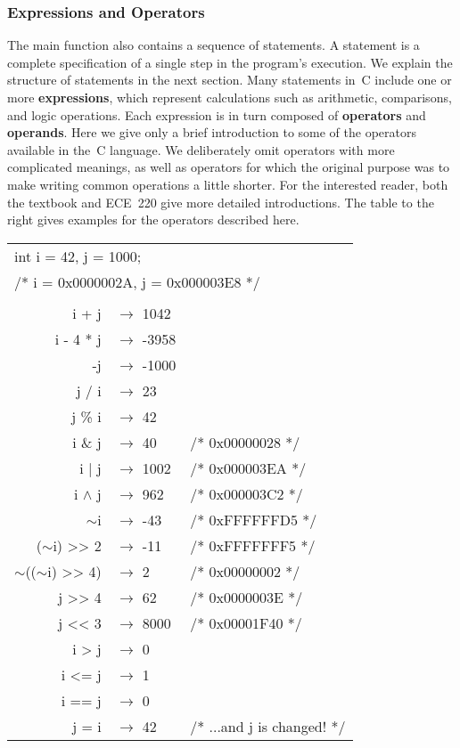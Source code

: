 \subsubsection{Expressions and Operators}

\begin{minipage}{2.6in}
The {\tfix main} function also contains a sequence of statements.
%
A statement is a complete specification of a single step
in the program's execution.
%
We explain the structure of
statements in the next section.  
%
Many statements in~C include one or more {\bf expressions},
which represent calculations such as arithmetic, comparisons,
and logic operations.
%
Each expression is in turn composed of {\bf operators} and {\bf operands}.
%
Here we give only a brief introduction to some of the operators available
in the~C language.  We deliberately omit operators with more
complicated meanings, as well as operators for which the original
purpose was to make writing common operations a little shorter.
%
For the interested reader, both the textbook and ECE~220 give more 
detailed introductions.
%
The table to the right gives examples for the operators described 
here.  \vspace{2pt}

\end{minipage}\hspace{0.25in}%
\begin{minipage}{3.65in}
{\fix
\begin{tabular}{rll}
\multicolumn{3}{l}{int i = 42, j = 1000;}\\
\multicolumn{3}{l}{/* i = 0x0000002A, j = 0x000003E8 */}\\
\\
i + j & $\rightarrow$ 1042\\
i - 4 * j & $\rightarrow$ -3958\\
-j & $\rightarrow$ -1000\\
j / i & $\rightarrow$ 23\\
j \% i &  $\rightarrow$ 42\\
i \& j &  $\rightarrow$ 40& /* 0x00000028 */\\
i | j &  $\rightarrow$ 1002& /* 0x000003EA */\\
i $\wedge$ j &  $\rightarrow$ 962& /* 0x000003C2 */\\
$\sim$i &  $\rightarrow$ -43& /* 0xFFFFFFD5 */\\
($\sim$i) >> 2 &  $\rightarrow$ -11& /* 0xFFFFFFF5 */\\
$\sim$(($\sim$i) >> 4) &  $\rightarrow$ 2& /* 0x00000002 */\\
j >> 4 & $\rightarrow$ 62& /* 0x0000003E */\\ 
j << 3 & $\rightarrow$ 8000& /* 0x00001F40 */\\ 
i > j &  $\rightarrow$ 0\\
i <= j &  $\rightarrow$ 1\\
i == j &  $\rightarrow$ 0\\
j = i &  $\rightarrow$ 42& /* ...and j is changed! */\\
\end{tabular}
}
\end{minipage}

